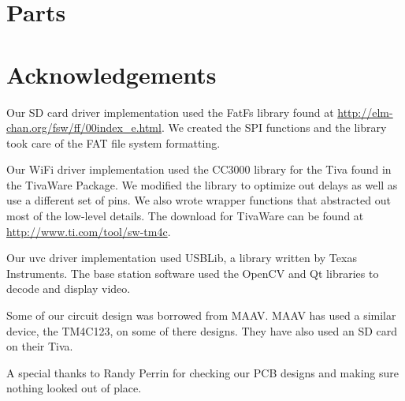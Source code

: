 \documentclass[12pt]{article}
\begin{document}
\section{Parts}

\section{Acknowledgements}

Our SD card driver implementation used the FatFs library found at
\url{http://elm-chan.org/fsw/ff/00index\_e.html}. We created the SPI functions
and the library took care of the FAT file system formatting.

Our WiFi driver implementation used the CC3000 library for the Tiva found in
the TivaWare Package. We modified the library to optimize out delays as well as
use a different set of pins. We also wrote wrapper functions that abstracted
out most of the low-level details. The download for TivaWare can be found at
\url{http://www.ti.com/tool/sw-tm4c}.

Our \gls{uvc} driver implementation used USBLib, a library written by Texas
Instruments. The base station software used the OpenCV and Qt libraries to
decode and display video.

Some of our circuit design was borrowed from MAAV. MAAV has used a similar
device, the TM4C123, on some of there designs. They have also used an SD card
on their Tiva.

A special thanks to Randy Perrin for checking our PCB designs and making sure
nothing looked out of place.

\newpage




\newpage

\appendix
\end{document}
